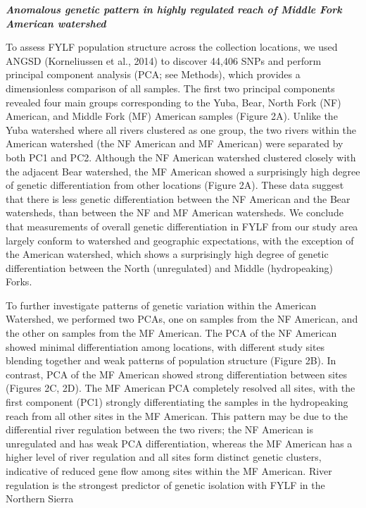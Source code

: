 \documentclass[twoside,12pt,final]{ucthesis-CA2012} %
\begin{document}
\begin{ucmainmatter}
\textbf{\emph{Anomalous genetic pattern in highly regulated reach of
Middle Fork American watershed}}

To assess FYLF population structure across the collection locations, we
used ANGSD (Korneliussen et al., 2014) to discover 44,406 SNPs and
perform principal component analysis (PCA; see Methods), which provides
a dimensionless comparison of all samples. The first two principal
components revealed four main groups corresponding to the Yuba, Bear,
North Fork (NF) American, and Middle Fork (MF) American samples (Figure
2A). Unlike the Yuba watershed where all rivers clustered as one group,
the two rivers within the American watershed (the NF American and MF
American) were separated by both PC1 and PC2. Although the NF American
watershed clustered closely with the adjacent Bear watershed, the MF
American showed a surprisingly high degree of genetic differentiation
from other locations (Figure 2A). These data suggest that there is less
genetic differentiation between the NF American and the Bear watersheds,
than between the NF and MF American watersheds. We conclude that
measurements of overall genetic differentiation in FYLF from our study
area largely conform to watershed and geographic expectations, with the
exception of the American watershed, which shows a surprisingly high
degree of genetic differentiation between the North (unregulated) and
Middle (hydropeaking) Forks.

To further investigate patterns of genetic variation within the American
Watershed, we performed two PCAs, one on samples from the NF American,
and the other on samples from the MF American. The PCA of the NF
American showed minimal differentiation among locations, with different
study sites blending together and weak patterns of population structure
(Figure 2B). In contrast, PCA of the MF American showed strong
differentiation between sites (Figures 2C, 2D). The MF American PCA
completely resolved all sites, with the first component (PC1) strongly
differentiating the samples in the hydropeaking reach from all other
sites in the MF American. This pattern may be due to the differential
river regulation between the two rivers; the NF American is unregulated
and has weak PCA differentiation, whereas the MF American has a higher
level of river regulation and all sites form distinct genetic clusters,
indicative of reduced gene flow among sites within the MF American.
River regulation is the strongest predictor of genetic isolation with
FYLF in the Northern Sierra


\end{ucmainmatter}
\end{document}
